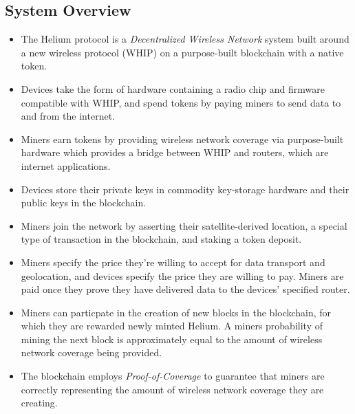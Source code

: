 \documentclass[letterpaper,11pt]{article}
\def\proofofcoverage/{\emph{Proof-of-Coverage}}
\begin{document}
\subsection{System Overview}

\begin{itemize}
	\item The Helium protocol is a \emph{Decentralized Wireless Network} system built around a new wireless protocol (WHIP) on a purpose-built blockchain with a native token.
	\item Devices take the form of hardware containing a radio chip and firmware compatible with WHIP, and spend tokens by paying miners to send data to and from the internet.
	\item Miners earn tokens by providing wireless network coverage via purpose-built hardware which provides a bridge between WHIP and routers, which are internet applications.
	\item Devices store their private keys in commodity key-storage hardware and their public keys in the blockchain.
	\item Miners join the network by asserting their satellite-derived location, a special type of transaction in the blockchain, and staking a token deposit.
	\item Miners specify the price they're willing to accept for data transport and geolocation, and devices specify the price they are willing to pay. Miners are paid once they prove they have delivered data to the devices' specified router.
	\item Miners can particpate in the creation of new blocks in the blockchain, for which they are rewarded newly minted Helium. A miners probability of mining the next block is approximately equal to the amount of wireless network coverage being provided.
	\item The blockchain employs \proofofcoverage/ to guarantee that miners are correctly representing the amount of wireless network coverage they are creating.
\end{itemize}
\end{document}
